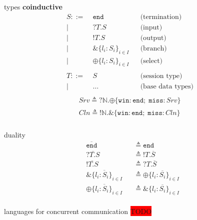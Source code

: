 \documentclass[dvipsnames]{beamer}
\newcommand{\type}[1]{\mathtt{#1}}
\newcommand{\tend}[0]{\type{end}}
\newcommand{\trecv}[1]{\type{?} #1 \type{.}}
\newcommand{\tsend}[1]{\type{!} #1 \type{.}}
\newcommand{\tbranch}[2]{\type{\&} \{ #1 \}_{#2}}
\newcommand{\tselect}[2]{\type{\oplus} \{ #1 \}_{#2}}
\newcommand{\dual}[1]{\overline{#1}}
\newcommand{\is}[0]{\triangleq}
\begin{document}
  \begin{frame}{types}
    \textbf{coinductive}
    \setlength{\abovedisplayskip}{0pt}
    \setlength{\belowdisplayskip}{0pt}
    \setlength{\abovedisplayshortskip}{0pt}
    \setlength{\belowdisplayshortskip}{0pt}
    \begin{align*}
      S ::=& \; \tend      &&\text{(termination)}    \\ 
      |& \; \trecv{T}S     &&\text{(input)}       \\ 
      |& \; \tsend{T}S     &&\text{(output)}       \\           
      |& \; \tbranch{l_i : S_i}{i \in I} &&\text{(branch)}       \\ 
      |& \; \tselect{l_i : S_i}{i \in I} &&\text{(select)}       \\           
      \\
      T ::=& \; S      &&\text{(session type)} \\
      | & \; \ldots      &&\text{(base data types)} \\
    \end{align*}
    \begin{align*}
      Srv \is \trecv{\mathtt{\mathbb{N}}} \tselect{\mathtt{win} : \tend ; \; \mathtt{miss} : Srv}{} \\
      Cln \is \tsend{\mathtt{\mathbb{N}}} \tbranch{\mathtt{win} : \tend ; \; \mathtt{miss} : Cln}{} \\
    \end{align*}
  \end{frame}

  \begin{frame}{duality}
    \begin{equation*}
      \begin{aligned}
        &\dual{\tend}          &&\is \tend\\
        &\dual{\trecv{T}S}     &&\is \tsend{T}\dual{S}\\
        &\dual{\tsend{T}S}     &&\is \trecv{T}\dual{S}\\
        &\dual{\tbranch{l_i : S_i}{i \in I}} &&\is \tselect{l_i : \dual{S_i}}{i \in I}\\
        &\dual{\tselect{l_i : S_i}{i \in I}} &&\is \tbranch{l_i : \dual{S_i}}{i \in I}\\
      \end{aligned}
    \end{equation*}
  \end{frame}

  \begin{frame}{languages for concurrent communication}
    \colorbox{red}{TODO}
  \end{frame}
  
\end{document}
